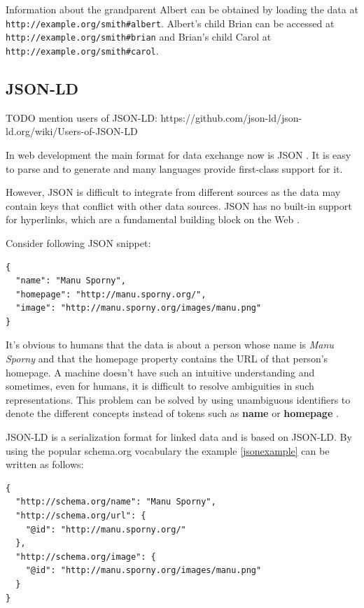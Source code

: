 Information about the grandparent Albert can be obtained by loading the data at \\ \lstinline{http://example.org/smith#albert}. Albert's child Brian can be accessed at \\  \lstinline{http://example.org/smith#brian} and Brian's child Carol at \lstinline{http://example.org/smith#carol}.

\subsection{JSON-LD}\label{jsonld}

TODO mention users of JSON-LD: https://github.com/json-ld/json-ld.org/wiki/Users-of-JSON-LD

In web development the main format for data exchange now is JSON \citep{jsonformat}. It is easy to parse and to generate and many languages provide first-class support for it.

However, JSON is difficult to integrate from different sources as the data may contain keys that conflict with other data sources. JSON has no built-in support for hyperlinks, which are a fundamental building block on the Web \citep{jsonldbasicconcepts}.

Consider following JSON snippet:

\lstset{language=JSON}
\begin{lstlisting}[caption=Data of a person in the JSON format, label=jsonexample]
{
  "name": "Manu Sporny",
  "homepage": "http://manu.sporny.org/",
  "image": "http://manu.sporny.org/images/manu.png"
}
\end{lstlisting}

It's obvious to humans that the data is about a person whose name is \textit{Manu Sporny} and that the homepage property contains the URL of that person's homepage. A machine doesn't have such an intuitive understanding and sometimes, even for humans, it is difficult to resolve ambiguities in such representations. This problem can be solved by using unambiguous identifiers to denote the different concepts instead of tokens such as \textbf{name} or \textbf{homepage} \citep{jsonldbasicconcepts}.

JSON-LD is a serialization format for linked data and is based on JSON-LD. By using the popular schema.org vocabulary the example \ref{jsonexample} can be written as follows:

\lstset{language=JSON}
\begin{lstlisting}[caption=Data of a person in the JSON-LD format, label=jsonldexample]
{
  "http://schema.org/name": "Manu Sporny",
  "http://schema.org/url": {
    "@id": "http://manu.sporny.org/"
  },
  "http://schema.org/image": {
    "@id": "http://manu.sporny.org/images/manu.png"
  }
}
\end{lstlisting}

